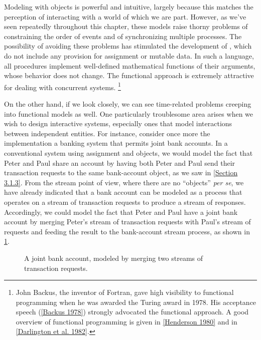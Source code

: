 Modeling with objects is powerful and intuitive, largely because this matches the perception of interacting with a world of which we are part.
However, as we’ve seen repeatedly throughout this chapter, these models raise thorny problems of constraining the order of events and of synchronizing multiple processes.
The possibility of avoiding these problems has stimulated the development of , which do not include any provision for assignment or mutable data.
In such a language, all procedures implement well-defined mathematical functions of their arguments, whose behavior does not change.
The functional approach is extremely attractive for dealing with concurrent systems.%
\footnote{
	John Backus, the inventor of Fortran, gave high visibility to functional programming when he was awarded the  Turing award in 1978.
	His acceptance speech (\cref{Backus 1978}) strongly advocated the functional approach.
	A good overview of functional programming is given in \cref{Henderson 1980} and in \cref{Darlington et al. 1982}.
}

On the other hand, if we look closely, we can see time-related problems creeping into functional models as well.
One particularly troublesome area arises when we wish to design interactive systems, especially ones that model interactions between independent entities.
For instance, consider once more the implementation a banking system that permits joint bank accounts.
In a conventional system using assignment and objects, we would model the fact that Peter and Paul share an account by having both Peter and Paul send their transaction requests to the same bank-account object, as we saw in \cref{Section 3.1.3}.
From the stream point of view, where there are no “objects” \emph{per se}, we have already indicated that a bank account can be modeled as a process that operates on a stream of transaction requests to produce a stream of responses.
Accordingly, we could model the fact that Peter and Paul have a joint bank account by merging Peter’s stream of transaction requests with Paul’s stream of requests and feeding the result to the bank-account stream process, as shown in \cref{Figure 3.38}.

\begin{figure}[tb]
	\centering
	
	\caption{
		A joint bank account, modeled by merging two streams of transaction requests.
	}
	\label{Figure 3.38}
\end{figure}

